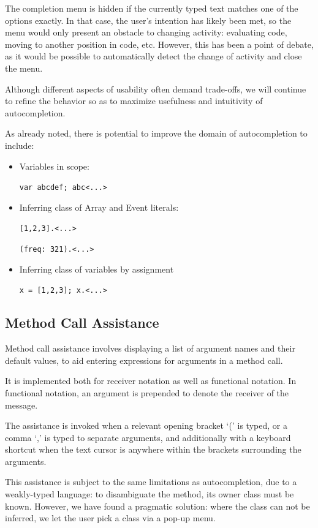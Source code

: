\documentclass[11pt,a4paper]{article}
\begin{document}
The completion menu is hidden if the currently typed text matches one of the options exactly. In
that case, the user's intention has likely been met, so the menu would only present an obstacle to
changing activity: evaluating code, moving to another position in code, etc. However, this has been
a point of debate, as it would be possible to automatically detect the change of activity and close
the menu.

Although different aspects of usability often demand trade-offs, we will continue to refine the
behavior so as to maximize usefulness and intuitivity of autocompletion.

As already noted, there is potential to improve the domain of autocompletion to include:
\begin{itemize}
 \item Variables in scope:

 \verb|var abcdef; abc<...>|

 \item Inferring class of Array and Event literals:

 \verb|[1,2,3].<...>|

 \verb|(freq: 321).<...>|

 \item Inferring class of variables by assignment

 \verb|x = [1,2,3]; x.<...>|

\end{itemize}

\subsection{Method Call Assistance}
\label{method-call-assistance}

Method call assistance involves displaying a list of argument names and their default values, to aid
entering expressions for arguments in a method call.

It is implemented both for receiver notation as well as functional notation. In functional notation,
an argument is prepended to denote the receiver of the message.

The assistance is invoked when a relevant opening bracket `(' is typed, or a comma `,' is typed to
separate arguments, and additionally with a keyboard shortcut when the text cursor is anywhere
within the brackets surrounding the arguments.

This assistance is subject to the same limitations as autocompletion, due to a weakly-typed
language: to disambiguate the method, its owner class must be known. However, we have found a
pragmatic solution: where the class can not be inferred, we let the user pick a class via a pop-up
menu.
\end{document}
